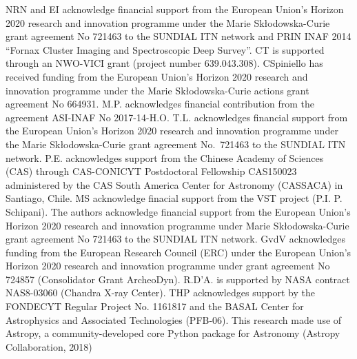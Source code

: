 \documentclass[usenatbib]{mnras}
\begin{document}
NRN and EI acknowledge financial support from the European Union's Horizon
2020 research and innovation programme under the Marie Sk\l{}odowska-Curie
grant agreement No 721463 to the SUNDIAL ITN network and  PRIN INAF 2014
``Fornax Cluster Imaging and Spectroscopic Deep Survey''.
CT is supported through an NWO-VICI grant (project number 639.043.308).
CSpiniello has received funding from the European Union's Horizon 2020
research and innovation programme under the Marie Sk\l{}odowska-Curie
actions grant agreement No 664931.
M.P. acknowledges financial contribution from the agreement ASI-INAF No 2017-14-H.O.
T.L. acknowledges financial support from the European Union's Horizon 2020
research and innovation programme under the Marie Sk\l{}odowska-Curie
grant agreement No.~721463 to the SUNDIAL ITN network.
P.E. acknowledges support from the Chinese Academy of Sciences (CAS)
through CAS-CONICYT Postdoctoral  Fellowship CAS150023 administered
by the CAS South America Center for Astronomy (CASSACA) in Santiago,  Chile.
MS acknowledge finacial support from the VST project (P.I. P. Schipani).
The authors acknowledge financial support from the European Union's
Horizon 2020 research and innovation programme under Marie Sk\l{}odowska-Curie
grant agreement No 721463 to the SUNDIAL ITN network.
GvdV acknowledges funding from the European Research Council (ERC) under
the European Union's Horizon 2020 research and innovation programme
under grant agreement No 724857 (Consolidator Grant ArcheoDyn).
R.D'A. is supported by NASA contract NAS8-03060 (Chandra X-ray Center).
THP acknowledges support by the FONDECYT Regular Project No. 1161817 and
the BASAL Center for Astrophysics and Associated Technologies (PFB-06).
This research made use of Astropy, a community-developed core Python
package for Astronomy (Astropy Collaboration, 2018)



\end{document}

